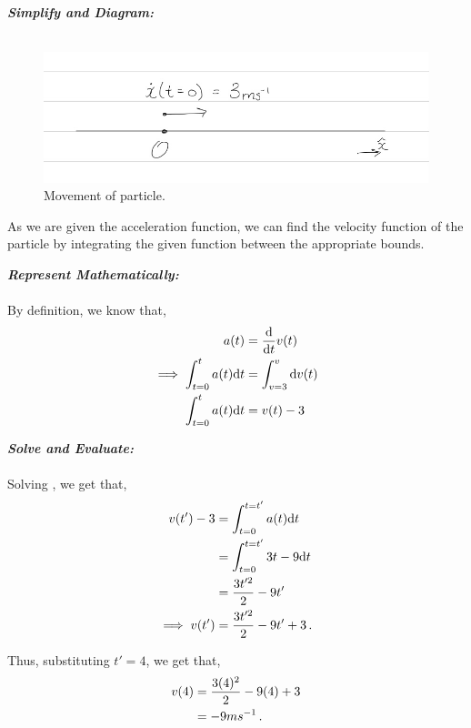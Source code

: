\begin{subquestions}
\begin{subsubquestions}
	
\textbf{\textit{Simplify and Diagram:}} \\ \\
\begin{figure}[H]
	\begin{center}
		\includegraphics[scale=0.25]{../2009/figures/2009q6-1}
		\caption{\label{2009:q6:Diagram1} Movement of particle.}
	\end{center}
\end{figure}
As we are given the acceleration function, we can find the velocity function of the particle by integrating the given function between the appropriate bounds.




\textbf{\textit{Represent Mathematically:}} \\ \\
By definition, we know that,
\begin{align}
	a(t) & = \frac{\mathrm{d}}{\mathrm{d}t}v(t) \nonumber \\
	\implies \int_{t=0}^{t}a(t)\mathrm{d} t & = \int_{v=3}^{v} \mathrm{d} v(t) \nonumber \\
	\int_{t=0}^{t}a(t)\mathrm{d} t & = v(t)-3 \label{2009:q6:VEqn1}
\end{align}




\textbf{\textit{Solve and Evaluate:}} \\ \\
Solving , we get that,
\begin{align}
	v(t')-3 & = \int_{t=0}^{t=t'}a(t)\mathrm{d} t \nonumber \\
	     & = \int_{t=0}^{t=t'} 3t-9 \mathrm{d} t \nonumber \\
	     & = \frac{3t'^2}{2}-9t' \nonumber \\
\implies v(t') & = \frac{3t'^2}{2}-9t' +3 \,.
\end{align}

Thus, substituting $t'=4$, we get that,
\begin{align}
	v(4) & = \frac{3(4)^2}{2}-9(4) +3 \nonumber \\
	     & = -9ms^{-1} \,.
\end{align}



\end{subsubquestions}
\end{subquestions}
